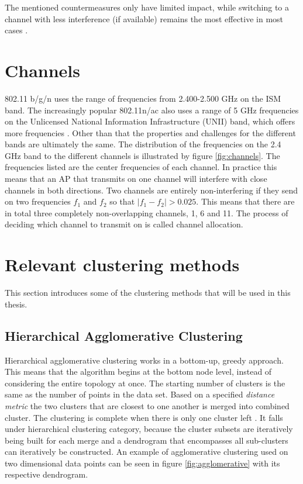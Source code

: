 	The mentioned countermeasures only have limited
	impact, while switching to a channel with less interference (if available) remains the most effective in most cases \cite{impactRF}. 
	\section{Channels} 
	802.11 b/g/n uses the range of frequencies from 2.400-2.500 GHz on the ISM band.
	The increasingly popular 802.11n/ac also uses a range of 5 GHz frequencies on the Unlicensed
	National Information Infrastructure (UNII) band, which offers more frequencies \cite{5ghz}.
	Other than that the properties and challenges for the different bands are ultimately the same.
	The distribution of the frequencies on the 2.4 GHz band to the different channels is illustrated by figure \ref{fig:channels}. The frequencies listed are the center frequencies of each channel. In practice this means that an AP that transmits on one channel will interfere with close channels in both directions. Two channels are entirely non-interfering if they send on two frequencies  $f_{1}$ and $f_{2}$ so that $|f_{1} - f_{2}| > 0.025$. This means that there are in total three completely non-overlapping channels, 1, 6 and 11. The process of deciding which channel to transmit on is called channel allocation. 


\section{Relevant clustering methods}
This section introduces some of the clustering methods that will be used in this thesis.

\subsection {Hierarchical Agglomerative Clustering}
Hierarchical agglomerative clustering works in a bottom-up, greedy approach. This means that the algorithm
begins at the bottom node level, instead of considering the entire topology at once.
The starting number of clusters is the same as the number of points in the data set. Based on a specified \textit{distance metric} the two clusters that are closest to one another is merged into combined cluster. The clustering is complete
when there is only one cluster left \cite{murtycluster}. It falls under hierarchical clustering category, because the cluster subsets are iteratively being built for each merge and a dendrogram
that encompasses all sub-clusters can iteratively be constructed. An example of agglomerative clustering used on two dimensional data points can be seen in figure \ref{fig:agglomerative}
with its respective dendrogram. 

